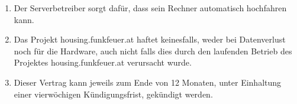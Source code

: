 \documentclass[parskip=half]{scrreprt}
\begin{document}
\begin{contract}
\begin{enumerate}
\item Der Serverbetreiber sorgt dafür, dass sein Rechner automatisch hochfahren kann.
\item Das Projekt housing.funkfeuer.at haftet keinesfalls, weder bei Datenverlust noch für die Hardware, auch nicht falls dies durch den laufenden Betrieb des Projektes housing.funkfeuer.at verursacht wurde.
\item Dieser Vertrag kann jeweils zum Ende von 12 Monaten, unter Einhaltung einer vierwöchigen Kündigungsfrist, gekündigt werden.
\end{enumerate}
\end{contract}




\end{document}
